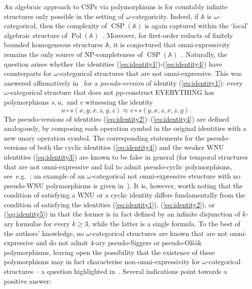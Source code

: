 \documentclass[a4paper,reqno, cleveref]{amsart}
\DeclareMathOperator{\CSP}{CSP}
\DeclareMathOperator{\Pol}{Pol}
\newcommand{\sA}{\mathbb A}
\begin{document}
 
An algebraic approach to CSPs via polymorphisms is for countably infinite structures only possible in the setting of $\omega$-categoricity. Indeed, 
if $\sA$ is $\omega$-categorical, 
then the complexity of $\CSP(\sA)$ is again captured within the `local' algebraic 
structure of $\Pol(\sA)$~\cite{Topo-Birk}. 
Moreover, for first-order reducts of finitely bounded homogeneous structures $\sA$, it is conjectured that omni-expressivity remains the only source of NP-completeness of $\CSP(\sA)$~\cite{BPP-projective-homomorphisms,wonderland,BKOPP,BKOPP-equations}. 
Naturally, the question arises whether the identities (\ref{eq:identity1})-(\ref{eq:identity4}) have counterparts for $\omega$-categorical structures that are not omni-expressive. 
This was answered affirmatively in~\cite{Topo} for a \emph{pseudo-version} of identity (\ref{eq:identity1}): 
every $\omega$-categorical structure that does not pp-construct EVERYTHING has polymorphisms $s,u,$ and $v$ witnessing the 
identity %
\begin{equation}\label{eq:pseudosiggers}
    u\circ s(x, y, x, z, y, z) \approx v \circ s(y, x, z, x, z, y).
\end{equation} 
The pseudo-versions of identities (\ref{eq:identity2})–(\ref{eq:identity4}) are defined analogously, by composing each operation symbol in the original identities with a new unary operation symbol. 
%
The corresponding statements for the pseudo-versions of both the cyclic identities (\ref{eq:identity4}) and the weaker  WNU identities (\ref{eq:identity3}) are known to be false in general (for  temporal structures that are not omni-expressive and fail to admit pseudo-cyclic polymorphisms,  see~e.g.~\cite[Proposition 12.9.1]{Book}; an example of an $\omega$-categorical not omni-expressive structure with no pseudo-WNU polymorphisms is given in~\cite[Theorem 4]{symmetries}). 
%
It is, however, worth noting that the condition of satisfying a WNU or a cyclic identity  differs fundamentally from the condition of satisfying the identities (\ref{eq:identity1}), (\ref{eq:identity2}), or  (\ref{eq:identity5}) in that the former is  in fact  defined by an infinite disjunction of $k$-ary formulae for every $k \geq 3$,  while the latter is a single formula. 
%
To the best of the authors' knowledge, no $\omega$-categorical structures are known that are not omni-expressive and do not admit $4$-ary pseudo-Siggers or  pseudo-Ol\v{s}\'ak polymorphisms, leaving open the possibility that the existence of these polymorphisms may in fact characterise non-omni-expressivity for $\omega$-categorical structures --  a question highlighted in~\cite[Question $22$]{Book}. Several indications point towards a positive answer: 
\end{document}
